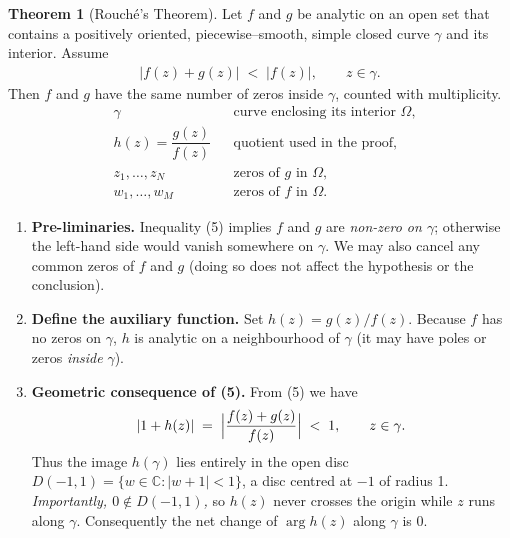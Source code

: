 \documentclass[12pt]{article}
\theoremstyle{definition} %
\newtheorem{theorem}{Theorem}
\theoremstyle{plain} %
\begin{document}
\begin{theorem}[Rouché’s Theorem]
    Let $f$ and $g$ be analytic on an open set that contains a positively
    oriented, piecewise–smooth, simple closed curve $\gamma$ and its interior.
    Assume 
    \begin{align}
        |f(z)+g(z)| \;<\; |f(z)|, \qquad z\in\gamma. \tag{5}
    \end{align}
    Then $f$ and $g$ have the same number of zeros inside $\gamma$, counted
    with multiplicity.
    \begin{align}
        &\gamma                &&\text{curve enclosing its interior $\Omega$},\\
        &h(z)=\dfrac{g(z)}{f(z)} &&\text{quotient used in the proof},\\
        &z_1,\dots,z_N         &&\text{zeros of $g$ in $\Omega$},\\
        &w_1,\dots,w_M         &&\text{zeros of $f$ in $\Omega$}.
    \end{align}

    \begin{enumerate}
        \item\textbf{Pre-liminaries.}  
              Inequality (5) implies $f$ and $g$ are \emph{non-zero on $\gamma$};
              otherwise the left-hand side would vanish somewhere on $\gamma$.
              We may also cancel any common zeros of $f$ and $g$
              (doing so does not affect the hypothesis or the conclusion).

        \item\textbf{Define the auxiliary function.}  
              Set $h(z)=g(z)/f(z)$.  
              Because $f$ has no zeros on $\gamma$, $h$ is analytic on a
              neighbourhood of $\gamma$ (it may have poles or zeros \emph{inside} $\gamma$).

        \item\textbf{Geometric consequence of (5).}  
              From (5) we have
              \[
                  |1+h(z)| \;=\;\Bigl|\frac{f(z)+g(z)}{f(z)}\Bigr| \;<\;1,
              \qquad z\in\gamma.
              \]
              Thus the image $h(\gamma)$ lies entirely in the open disc
              $D(-1,1)=\{w\in\mathbb{C}:|w+1|<1\}$, a disc centred at $-1$ of radius 1.
              \emph{Importantly, $0\notin D(-1,1)$,} so $h(z)$ never crosses the origin
              while $z$ runs along $\gamma$.
              Consequently the net change of $\arg h(z)$ along $\gamma$ is $0$.


\end{enumerate}
\end{theorem}
\end{document}
